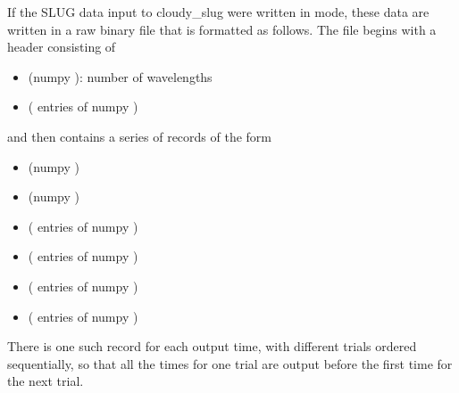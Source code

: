 \documentclass[letterpaper,10pt,english]{sphinxmanual}
\begin{document}
If the SLUG data input to cloudy\_slug were written in  mode,
these data are written in a raw binary file that is formatted as
follows. The file begins with a header consisting of
\begin{itemize}
\item {} 
 (numpy ): number of wavelengths

\item {} 
 ( entries of numpy )

\end{itemize}

and then contains a series of records of the form
\begin{itemize}
\item {} 
 (numpy )

\item {} 
 (numpy )

\item {} 
 ( entries of numpy )

\item {} 
 ( entries of numpy )

\item {} 
 ( entries of numpy )

\item {} 
 ( entries of numpy
)

\end{itemize}

There is one such record for each output time, with different trials ordered sequentially, so that all the times for one trial are output before the first time for the next trial.
\end{document}
